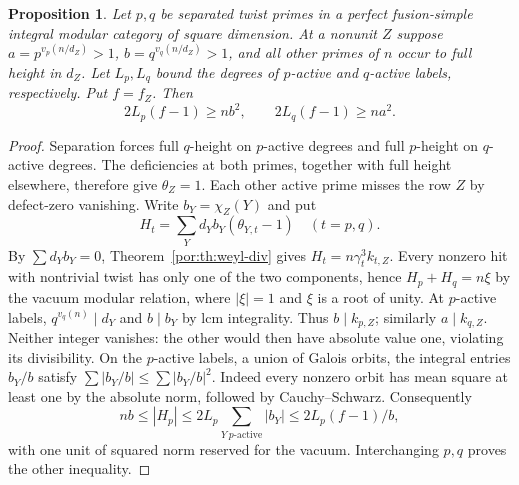 \documentclass[11pt,a4paper]{article}
\numberwithin{equation}{section}
\newtheorem{proposition}[theorem]{Proposition}
\theoremstyle{remark}
\begin{document}
\begin{proposition}\label{por:prop:separated-high-row}
Let $p,q$ be separated twist primes in a perfect fusion-simple integral modular category of square dimension. At a nonunit $Z$ suppose $a=p^{v_p(n/d_Z)}>1$, $b=q^{v_q(n/d_Z)}>1$, and all other primes of $n$ occur to full height in $d_Z$. Let $L_p,L_q$ bound the degrees of $p$-active and $q$-active labels, respectively. Put $f=f_Z$. Then
\[
             2L_p(f-1)\ge nb^2,\qquad 2L_q(f-1)\ge na^2.
\]
\end{proposition}
\begin{proof}
Separation forces full $q$-height on $p$-active degrees and full $p$-height on $q$-active degrees. The deficiencies at both primes, together with full height elsewhere, therefore give $\theta_Z=1$. Each other active prime misses the row $Z$ by defect-zero vanishing. Write $b_Y=\chi_Z(Y)$ and put
\[
   H_t=\sum_Y d_Y b_Y(\theta_{Y,t}-1)\quad(t=p,q).
\]
By $\sum d_Yb_Y=0$, Theorem~\ref{por:th:weyl-div} gives $H_t=n\gamma_t^3k_{t,Z}$. Every nonzero hit with nontrivial twist has only one of the two components, hence $H_p+H_q=n\xi$ by the vacuum modular relation, where $|\xi|=1$ and $\xi$ is a root of unity. At $p$-active labels, $q^{v_q(n)}\mid d_Y$ and $b\mid b_Y$ by lcm integrality. Thus $b\mid k_{p,Z}$; similarly $a\mid k_{q,Z}$. Neither integer vanishes: the other would then have absolute value one, violating its divisibility. On the $p$-active labels, a union of Galois orbits, the integral entries $b_Y/b$ satisfy $\sum |b_Y/b|\le\sum |b_Y/b|^2$. Indeed every nonzero orbit has mean square at least one by the absolute norm, followed by Cauchy--Schwarz. Consequently
\[
      nb\le |H_p|\le2L_p\sum_{Y\ p\text{-active}}|b_Y|
                  \le 2L_p(f-1)/b ,
\]
with one unit of squared norm reserved for the vacuum. Interchanging $p,q$ proves the other inequality.
\end{proof}
\end{document}
